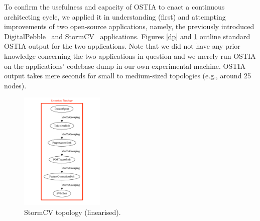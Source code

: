 To confirm the usefulness and capacity of OSTIA to enact a continuous
architecting cycle, we applied it in understanding (first) and attempting
improvements of two open-source applications, namely, the previously introduced
DigitalPebble~\cite{digitalpebble} and 
StormCV~\cite{stormCV}
applications. Figures \ref{dp} and \ref{scv} outline standard OSTIA output for the two applications. Note that we did not have any prior knowledge concerning the two applications in question and we merely run OSTIA on the applications' codebase dump in our own experimental machine. OSTIA output takes mere seconds for small to medium-sized topologies (e.g., around 25 nodes). 
%
\begin{figure}
\begin{center}
\includegraphics[width=4cm]{images/output/senti_storm}
		\caption{StormCV topology (linearised).}
		\label{scv}
		\end{center}
\end{figure}

